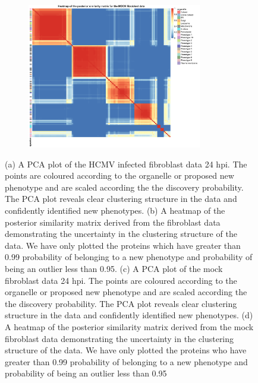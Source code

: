 \documentclass[12pt,english]{article}
\begin{document}
\begin{figure}
\begin{subfigure}[t]{0.5\textwidth}
	\centering
	\includegraphics[height=2.5in]{heatmapMOCK.pdf}
	\caption{}
\end{subfigure}
\caption{(a) A PCA plot of the HCMV infected fibroblast data 24 hpi. The points are coloured according to the organelle or proposed new phenotype and are scaled according the the discovery probability. The PCA plot reveals clear clustering structure in the data and confidently identified new phenotypes. (b) A heatmap of the posterior similarity matrix derived from the fibroblast data demonstrating the uncertainty in the clustering structure of the data. We have only plotted the proteins which have greater than 0.99 probability of belonging to a new phenotype and probability of being an outlier less than 0.95. (c) A PCA plot of the mock fibroblast data 24 hpi. The points are coloured according to the organelle or proposed new phenotype and are scaled according the the discovery probability. The PCA plot reveals clear clustering structure in the data and confidently identified new phenotypes. (d)  A heatmap of the posterior similarity matrix derived from the mock fibroblast data demonstrating the uncertainty in the clustering structure of the data. We have only plotted the proteins who have greater than 0.99 probability of belonging to a new phenotype and probability of being an outlier less than 0.95}
 \label{figure:Beltran}
\end{figure}
\clearpage
\end{document}
